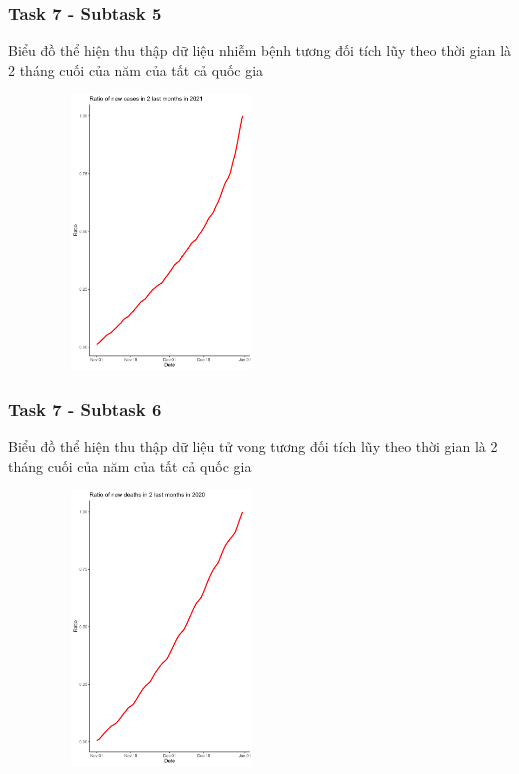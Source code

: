 \documentclass[english,10pt,table]{beamer}
\begin{document}
{
    \frametitle{Task 7 - Subtask 5}
    \begin{block}{Biểu đồ thể hiện thu thập dữ liệu nhiễm bệnh tương đối tích lũy theo thời gian là 2 tháng cuối của năm của tất cả quốc gia}
    \begin{figure}[H]
		\centering
		\includegraphics[height=7.3cm,width=6cm]{images/7.5.2.png}
	\end{figure}
    \end{block}
}
\frame
{
    \frametitle{Task 7 - Subtask 6}
    \begin{block}{Biểu đồ thể hiện thu thập dữ liệu tử vong tương đối tích lũy theo thời gian là 2 tháng cuối của năm của tất cả quốc gia}
    \begin{figure}[H]
		\centering
		\includegraphics[height=7.3cm,width=6cm]{images/7.6.1.png}
	\end{figure}
    \end{block}
}
\frame
\end{document}
